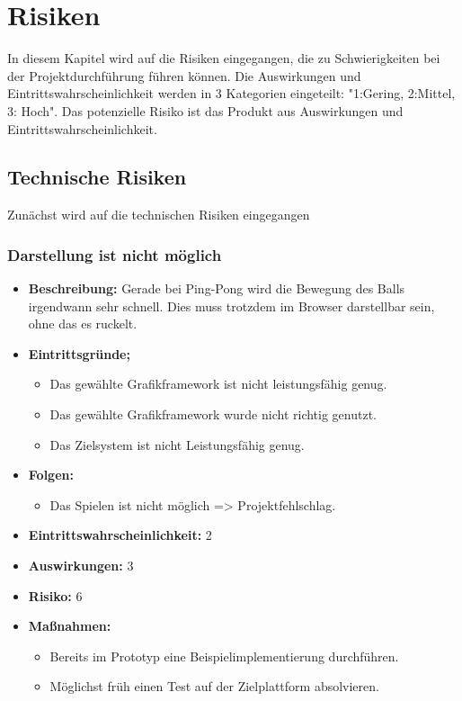 \section{Risiken}
In diesem Kapitel wird auf die Risiken eingegangen, die zu Schwierigkeiten bei der Projektdurchführung führen können. Die Auswirkungen und Eintrittswahrscheinlichkeit werden in 3 Kategorien eingeteilt: "1:Gering, 2:Mittel, 3: Hoch". Das potenzielle Risiko ist das Produkt aus Auswirkungen und Eintrittswahrscheinlichkeit.
\subsection{Technische Risiken}
Zunächst wird auf die technischen Risiken eingegangen
\subsubsection{Darstellung ist nicht möglich}
\begin{itemize}
	\item \textbf{Beschreibung:} \newline
	Gerade bei Ping-Pong wird die Bewegung des Balls irgendwann sehr schnell. Dies muss trotzdem im Browser darstellbar sein, ohne das es ruckelt.
	\item \textbf{Eintrittsgründe;}
	\begin{itemize}
		\item Das gewählte Grafikframework ist nicht leistungsfähig genug.
		\item Das gewählte Grafikframework wurde nicht richtig genutzt.
		\item Das Zielsystem ist nicht Leistungsfähig genug.
	\end{itemize}
	\item \textbf{Folgen:}
	\begin{itemize}
		\item Das Spielen ist nicht möglich => Projektfehlschlag.
	\end{itemize}
	\item \textbf{Eintrittswahrscheinlichkeit:} 2
	\item \textbf{Auswirkungen:} 3
	\item \textbf{Risiko:} 6
	\item \textbf{Maßnahmen:}
	\begin{itemize}
		\item Bereits im Prototyp eine Beispielimplementierung durchführen.
		\item Möglichst früh einen Test auf der Zielplattform absolvieren.
	\end{itemize}
\end{itemize}
